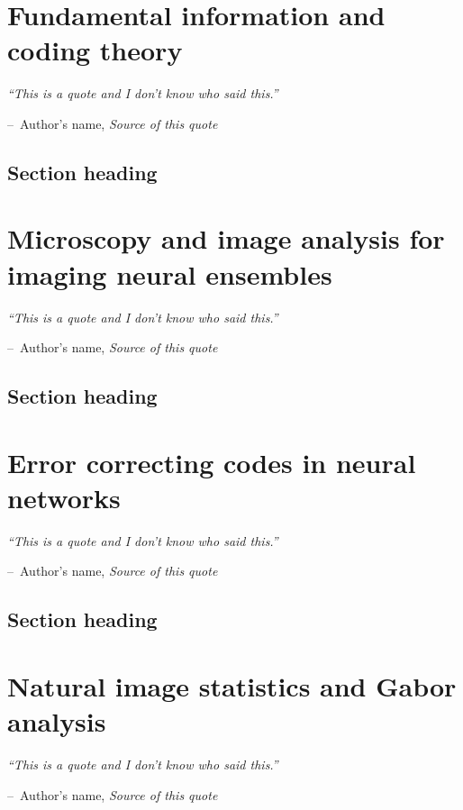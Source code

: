 \documentclass[a4paper,11pt]{book}
\makeatletter
\newenvironment{chapquote}[2][2em]
  {\setlength{\@tempdima}{#1}%
   \def\chapquote@author{#2}%
   \parshape 1 \@tempdima \dimexpr\textwidth-2\@tempdima\relax%
   \itshape}
  {\par\normalfont\hfill--\ \chapquote@author\hspace*{\@tempdima}\par\bigskip}
\makeatother
\begin{document}
\chapter{Fundamental information and coding theory}

\begin{chapquote}{Author's name, \textit{Source of this quote}}
``This is a quote and I don't know who said this.''
\end{chapquote}

\section{Section heading}

\chapter{Microscopy and image analysis for imaging neural ensembles}

\begin{chapquote}{Author's name, \textit{Source of this quote}}
``This is a quote and I don't know who said this.''
\end{chapquote}

\section{Section heading}

\chapter{Error correcting codes in neural networks}

\begin{chapquote}{Author's name, \textit{Source of this quote}}
``This is a quote and I don't know who said this.''
\end{chapquote}

\section{Section heading}

\chapter{Natural image statistics and Gabor analysis}

\begin{chapquote}{Author's name, \textit{Source of this quote}}
``This is a quote and I don't know who said this.''
\end{chapquote}
\end{document}
